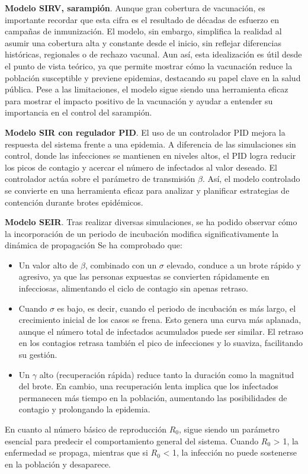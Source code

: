\vspace{2em}

\textbf{Modelo SIRV, sarampión}. Aunque gran cobertura de vacunación, es importante recordar que esta cifra es el resultado de décadas de esfuerzo en campañas de inmunización.  El modelo, sin embargo, simplifica la realidad al asumir una cobertura alta y constante desde el inicio, sin reflejar diferencias históricas, regionales o de rechazo vacunal.
Aun así, esta idealización es útil desde el punto de vista teórico, ya que permite mostrar cómo la vacunación reduce la población susceptible y previene epidemias, destacando su papel clave en la salud pública. Pese a las limitaciones, el modelo sigue siendo una herramienta eficaz para mostrar el impacto positivo de la vacunación y ayudar a entender su importancia en el control del sarampión.

\vspace{2em}


\textbf{Modelo SIR con regulador PID}.
El uso de un controlador PID mejora la respuesta del sistema frente a una epidemia. A diferencia de las simulaciones sin control, donde las infecciones se mantienen en niveles altos, el PID logra reducir los picos de contagio y acercar el número de infectados al valor deseado. El controlador actúa sobre el parámetro de transmisión 
$\beta$. Así, el modelo controlado se convierte en una herramienta eficaz para analizar y planificar estrategias de contención durante brotes epidémicos.
\vspace{2em}

\textbf{Modelo SEIR}. Tras realizar diversas simulaciones, se ha podido observar cómo la incorporación de un periodo de incubación modifica significativamente la dinámica de propagación 
Se ha comprobado que:
\begin{itemize}
    \item Un valor alto de $\beta$, combinado con un $\sigma$ elevado, conduce a un brote rápido y agresivo, ya que las personas expuestas se convierten rápidamente en infecciosas, alimentando el ciclo de contagio sin apenas retraso.
    \item Cuando $\sigma$ es bajo, es decir, cuando el periodo de incubación es más largo, el crecimiento inicial de los casos se frena. Esto genera una curva más aplanada, aunque el número total de infectados acumulados puede ser similar. El retraso en los contagios retrasa también el pico de infecciones y lo suaviza, facilitando su gestión.
    \item Un $\gamma$ alto (recuperación rápida) reduce tanto la duración como la magnitud del brote. En cambio, una recuperación lenta implica que los infectados permanecen más tiempo en la población, aumentando las posibilidades de contagio y prolongando la epidemia.
\end{itemize}
En cuanto al número básico de reproducción $R_0$, sigue siendo un parámetro esencial para predecir el comportamiento general del sistema. Cuando $R_0$ > 1, la enfermedad se propaga, mientras que si $R_0$ < 1, la infección no puede sostenerse en la población y desaparece.


